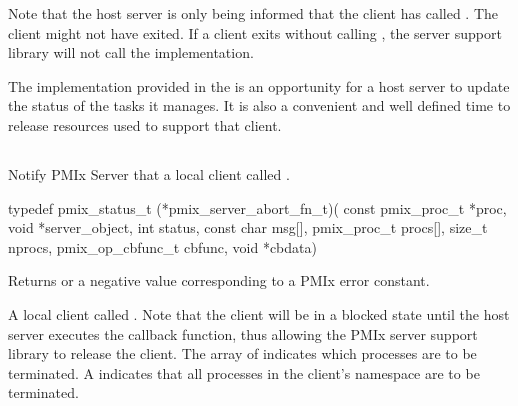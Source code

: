 Note that the host server is only being informed that the client has called .  The client might not have exited.  If a client
exits without calling , the server support library will not call the  implementation.

\adviceimplstart
 The  implementation provided in the  is an opportunity for a host server
 to update the status of the tasks it manages.  It is also a convenient and well defined time to release resources used to support that client.
 \adviceimplend


\subsection{}

\summary

Notify PMIx Server that a local client called .

\format

\cspecificstart
\begin{codepar}
typedef pmix_status_t (*pmix_server_abort_fn_t)(
                             const pmix_proc_t *proc, void *server_object,
                             int status, const char msg[],
                             pmix_proc_t procs[], size_t nprocs,
                             pmix_op_cbfunc_t cbfunc, void *cbdata)
\end{codepar}
\cspecificend


\begin{arglist}
\end{arglist}

Returns  or a negative value corresponding to a PMIx error constant.

\descr

A local client called .
Note that the client will be in a blocked state until the host server executes the callback function, thus allowing the PMIx server support library to release the client.
The array of  indicates which processes are to be terminated.
A  indicates that all processes in the client's namespace are to be terminated.


